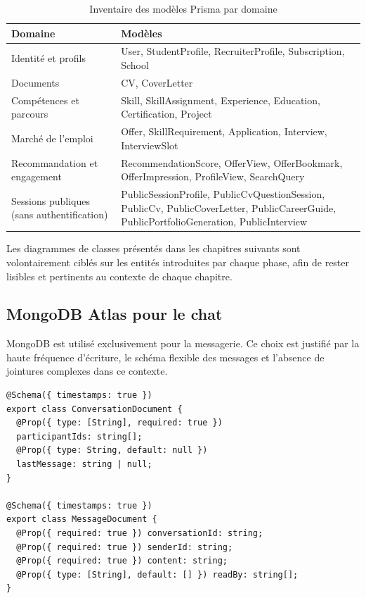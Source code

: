 ﻿\documentclass[12pt,a4paper]{report}
\begin{document}
\begin{table}[H]
\centering
\begin{tabularx}{\textwidth}{lX}
\toprule
\textbf{Domaine} & \textbf{Modèles} \\
\midrule
Identité et profils & User, StudentProfile, RecruiterProfile, Subscription, School \\
Documents & CV, CoverLetter \\
Compétences et parcours & Skill, SkillAssignment, Experience, Education, Certification, Project \\
Marché de l'emploi & Offer, SkillRequirement, Application, Interview, InterviewSlot \\
Recommandation et engagement & RecommendationScore, OfferView, OfferBookmark, OfferImpression, ProfileView, SearchQuery \\
Sessions publiques (sans authentification) & PublicSessionProfile, PublicCvQuestionSession, PublicCv, PublicCoverLetter, PublicCareerGuide, PublicPortfolioGeneration, PublicInterview \\
\bottomrule
\end{tabularx}
\caption{Inventaire des modèles Prisma par domaine}
\end{table}

Les diagrammes de classes présentés dans les chapitres suivants sont volontairement ciblés sur les entités introduites par chaque phase, afin de rester lisibles et pertinents au contexte de chaque chapitre.

\subsection{MongoDB Atlas pour le chat}
MongoDB est utilisé exclusivement pour la messagerie. Ce choix est justifié par la haute fréquence d'écriture, le schéma flexible des messages et l'absence de jointures complexes dans ce contexte.

\begin{lstlisting}[style=ts, caption={Schémas Mongoose — Conversation et Message}]
@Schema({ timestamps: true })
export class ConversationDocument {
  @Prop({ type: [String], required: true })
  participantIds: string[];
  @Prop({ type: String, default: null })
  lastMessage: string | null;
}

@Schema({ timestamps: true })
export class MessageDocument {
  @Prop({ required: true }) conversationId: string;
  @Prop({ required: true }) senderId: string;
  @Prop({ required: true }) content: string;
  @Prop({ type: [String], default: [] }) readBy: string[];
}
\end{lstlisting}
\end{document}
